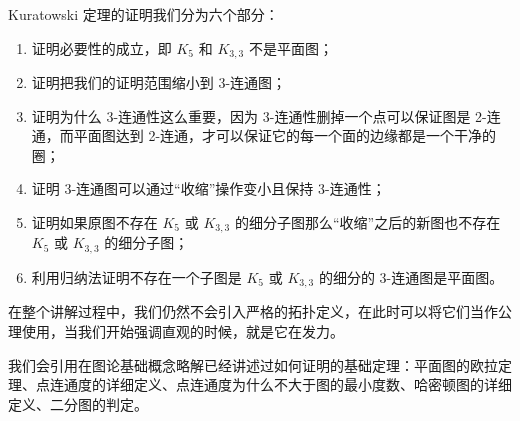 \documentclass[11pt, a4paper]{ctexart}
\begin{document}
Kuratowski 定理的证明我们分为六个部分：
\begin{enumerate}
    \item 证明必要性的成立，即 $K_5$ 和 $K_{3,3}$ 不是平面图；
    \item 证明把我们的证明范围缩小到 3-连通图；
    \item 证明为什么 3-连通性这么重要，因为 3-连通性删掉一个点可以保证图是 2-连通，而平面图达到 2-连通，才可以保证它的每一个面的边缘都是一个干净的圈；
    \item 证明 3-连通图可以通过“收缩”操作变小且保持 3-连通性；
    \item 证明如果原图不存在 $K_5$ 或 $K_{3,3}$ 的细分子图那么“收缩”之后的新图也不存在 $K_5$ 或 $K_{3,3}$ 的细分子图；
    \item 利用归纳法证明不存在一个子图是 $K_5$ 或 $K_{3,3}$ 的细分的 3-连通图是平面图。
\end{enumerate}

在整个讲解过程中，我们仍然不会引入严格的拓扑定义，在此时可以将它们当作公理使用，当我们开始强调直观的时候，就是它在发力。

我们会引用在图论基础概念略解已经讲述过如何证明的基础定理：平面图的欧拉定理、点连通度的详细定义、点连通度为什么不大于图的最小度数、哈密顿图的详细定义、二分图的判定。
\end{document}
